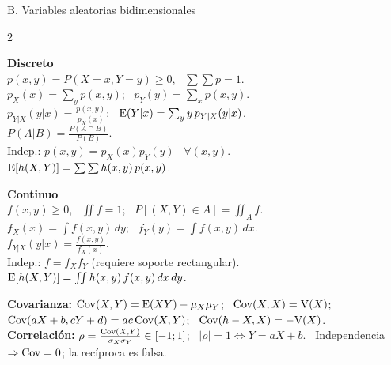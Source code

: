 {\begin{hoja}{B. Variables aleatorias bidimensionales}
\setlength{\columnsep}{16pt}
\begin{multicols}{2}\raggedright
\textbf{Discreto}\\
$p(x,y)=P(X=x,Y=y)\ge0$, \ $\sum\sum p=1$.\\
$p_X(x)=\sum_y p(x,y)$; \ $p_Y(y)=\sum_x p(x,y)$.\\
$p_{Y|X}(y|x)=\frac{p(x,y)}{p_X(x)}$; \ $\mathrm{E}(Y|x)=\sum_y y\,p_{Y|X}(y|x)$.\\
$P(A|B)=\frac{P(A\cap B)}{P(B)}$.\\
Indep.: $p(x,y)=p_X(x)p_Y(y)$ \ $\forall(x,y)$.\\
$\mathrm{E}[h(X,Y)]=\sum\sum h(x,y)\,p(x,y)$.

\columnbreak
\textbf{Continuo}\\
$f(x,y)\ge0$, \ $\iint f=1$; \ $P[(X,Y)\in A]=\iint_A f$.\\
$f_X(x)=\int f(x,y)\,dy$; \ $f_Y(y)=\int f(x,y)\,dx$.\\
$f_{Y|X}(y|x)=\frac{f(x,y)}{f_X(x)}$.\\
Indep.: $f=f_Xf_Y$ (requiere soporte rectangular).\\
$\mathrm{E}[h(X,Y)]=\iint h(x,y)\,f(x,y)\,dx\,dy$.
\end{multicols}
\vspace{-6pt}
\textbf{Covarianza:} $\mathrm{Cov}(X,Y)=\mathrm{E}(XY)-\mu_X\mu_Y$; \ $\mathrm{Cov}(X,X)=\mathrm{V}(X)$; \ $\mathrm{Cov}(aX+b,cY+d)=ac\,\mathrm{Cov}(X,Y)$; \ $\mathrm{Cov}(h-X,X)=-\mathrm{V}(X)$.\\
\textbf{Correlación:} $\rho=\frac{\mathrm{Cov}(X,Y)}{\sigma_X\sigma_Y}\in[-1;1]$; \ $|\rho|=1\iff Y=aX+b$. \ Independencia $\Rightarrow\mathrm{Cov}=0$; la recíproca es falsa.
\end{hoja}

}
